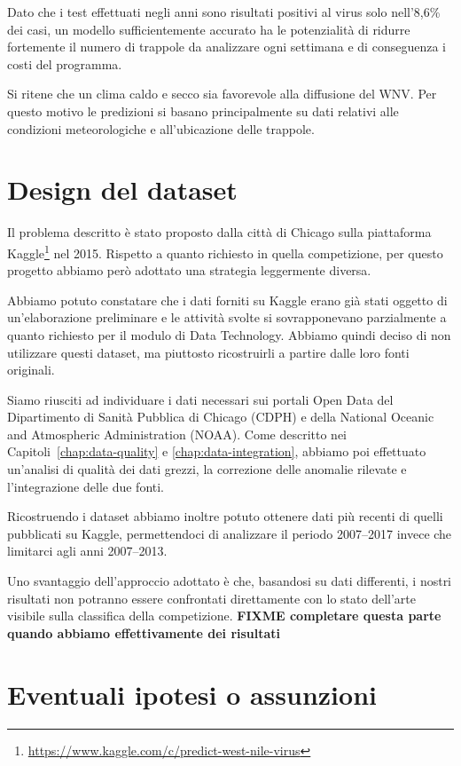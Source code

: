 Dato che i test effettuati negli anni sono risultati positivi al virus solo 
nell'8,6\% dei casi, un modello sufficientemente accurato ha le potenzialità di 
ridurre fortemente il numero di trappole da analizzare ogni settimana e di 
conseguenza i costi del programma. 


Si ritene che un clima caldo e secco sia favorevole alla diffusione del WNV. 
Per questo motivo le predizioni si basano principalmente su dati relativi alle 
condizioni meteorologiche e all'ubicazione delle trappole.

\section{Design del dataset}

Il problema descritto è stato proposto dalla città di Chicago sulla piattaforma 
Kaggle\footnote{\url{https://www.kaggle.com/c/predict-west-nile-virus}} nel 
2015. Rispetto a quanto richiesto in quella competizione, per questo progetto 
abbiamo però adottato una strategia leggermente diversa.

Abbiamo potuto constatare che i dati forniti su Kaggle erano già stati oggetto 
di un'elaborazione preliminare e le attività svolte si sovrapponevano 
parzialmente a quanto richiesto per il modulo di Data Technology. Abbiamo 
quindi deciso di non utilizzare questi dataset, ma piuttosto ricostruirli a 
partire dalle loro fonti originali.

Siamo riusciti ad individuare i dati necessari sui portali Open Data del 
Dipartimento di Sanità Pubblica di Chicago (CDPH) e della National Oceanic and 
Atmospheric Administration (NOAA). Come descritto nei 
Capitoli~\ref{chap:data-quality} e \ref{chap:data-integration}, abbiamo poi 
effettuato un'analisi di qualità dei dati grezzi, la correzione delle anomalie 
rilevate e l'integrazione delle due fonti.

Ricostruendo i dataset abbiamo inoltre potuto ottenere dati più recenti di 
quelli pubblicati su Kaggle, permettendoci di analizzare il periodo 2007--2017 
invece che limitarci agli anni 2007--2013.

Uno svantaggio dell'approccio adottato è che, basandosi su dati differenti, i 
nostri risultati non potranno essere confrontati direttamente con lo stato 
dell'arte visibile sulla classifica della competizione. \textbf{FIXME 
completare questa parte quando abbiamo effettivamente dei risultati}

\section{Eventuali ipotesi o assunzioni}

